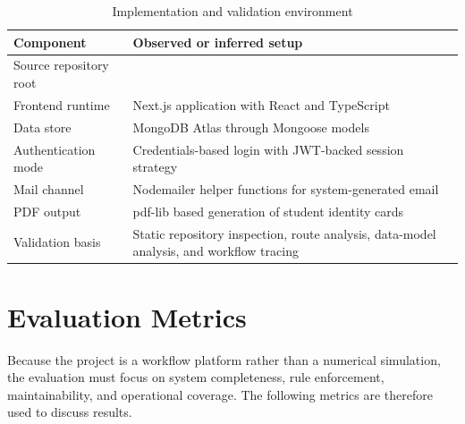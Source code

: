 \documentclass[12pt,a4paper]{report}
\newcommand{\filepath}[1]{\texttt{\detokenize{#1}}}
\begin{document}
\begin{table}[H]
  \centering
  \caption{Implementation and validation environment}
  \label{tab:environment}
  \renewcommand{\arraystretch}{1.2}
  \begin{tabularx}{\textwidth}{p{1.7in}Y}
    \toprule
    \textbf{Component} & \textbf{Observed or inferred setup} \\
    \midrule
    Source repository root & \filepath{d:/SystemDemo} \\
    Frontend runtime & Next.js application with React and TypeScript \\
    Data store & MongoDB Atlas through Mongoose models \\
    Authentication mode & Credentials-based login with JWT-backed session strategy \\
    Mail channel & Nodemailer helper functions for system-generated email \\
    PDF output & pdf-lib based generation of student identity cards \\
    Validation basis & Static repository inspection, route analysis, data-model analysis, and workflow tracing \\
    \bottomrule
  \end{tabularx}
\end{table}

\section{Evaluation Metrics}
Because the project is a workflow platform rather than a numerical simulation, the evaluation must focus on system completeness, rule enforcement, maintainability, and operational coverage. The following metrics are therefore used to discuss results.
\end{document}
